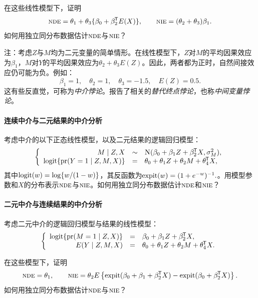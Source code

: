 在这些线性模型下，证明
$$
\textsc{nde} = \theta_1 + \theta_3\{ \beta_0 + \beta_2^{\mkern-1.5mu\mathsf{T}} E(X)\}, \qquad 
\textsc{nie} = (\theta_2 + \theta_3 ) \beta_1. 
$$
如何用独立同分布数据估计$\textsc{nde}$与$\textsc{nie}$？

注：考虑$Z$与$M$均为二元变量的简单情形。在线性模型下，$Z$对$M$的平均因果效应为$\beta_1$，$M$对$Y$的平均因果效应为$\theta_2 + \theta_3 E(Z)$。因此，两者都为正时，自然间接效应仍可能为负。例如：
$$
\beta_1 = 1,\quad \theta_2 = 1, \quad  \theta_3= -1.5, \quad E(Z) = 0.5.
$$
这有些反直觉，可称为{\it 中介悖论}。\citet{chen2007criteria}报告了相关的{\it 替代终点悖论}，也称{\it 中间变量悖论}。



\paragraph{连续中介与二元结果的中介分析}\label{para::continM-binaryY}


考虑中介的以下正态线性模型，以及二元结果的逻辑回归模型：
$$
\left\{\begin{array}{rcl}
M \mid Z, X &\sim &  \textsc{N}(\beta_0 + \beta_1 Z + \beta_2^{\mkern-1.5mu\mathsf{T}} X, \sigma_M^2), \\
\textup{logit} \{ \textup{pr}(Y = 1 \mid Z,M,X ) \} &=& \theta_0 + \theta_1 Z + \theta_2 M +   \theta_4^{\mkern-1.5mu\mathsf{T}} X,
\end{array}\right.
$$
其中$\textup{logit} (w)  = \log\{ w/(1-w) \} $，其反函数为$\textup{expit}(w) = (1 + e^{-w})^{-1}.$。用模型参数和$X$的分布表示$\textsc{nde}$与$\textsc{nie}$。如何用独立同分布数据估计$\textsc{nde}$和$\textsc{nie}$？




\paragraph{二元中介与连续结果的中介分析}\label{para::logit-binary-m}
考虑二元中介的逻辑回归模型与结果的线性模型：
$$
\left\{\begin{array}{rcl}
\textup{logit}\{ \textup{pr}(M  = 1\mid Z, X) \}&=&  \beta_0 + \beta_1 Z + \beta_2^{\mkern-1.5mu\mathsf{T}} X, \\
E(Y\mid Z,M,X) &=& \theta_0 + \theta_1 Z + \theta_2 M +   \theta_4^{\mkern-1.5mu\mathsf{T}} X . 
\end{array}\right.
$$


在这些模型下，证明
$$
\textsc{nde} = \theta_1  ,\qquad
\textsc{nie} = \theta_2 E \left\{  \textup{expit}(\beta_0 + \beta_1  + \beta_2^{\mkern-1.5mu\mathsf{T}} X)
-  \textup{expit}(\beta_0   + \beta_2^{\mkern-1.5mu\mathsf{T}} X)  \right\}. 
$$
如何用独立同分布数据估计$\textsc{nde}$与$\textsc{nie}$？






